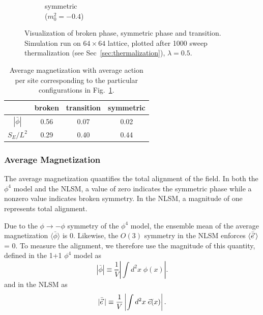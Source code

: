 \begin{figure}[h]
\begin{center}
\begin{subfigure}[b]{0.3\textwidth}
        \caption{symmetric\\($m_0^2=-0.4$)}
      \end{subfigure}
      \hfill
      \caption{\label{fig:primary observables} Visualization of broken phase, symmetric phase and transition. Simulation run on $64\times64$ lattice, plotted after 1000 sweep thermalization (see Sec~\ref{sec:thermalization}), $\lambda=0.5$.}
  \end{center}
\end{figure}

\begin{table}[h]
    \begin{center}
    {\renewcommand{\arraystretch}{1.2} %
    \begin{tabular}{c c c c}
        \hline\hline & broken & transition & symmetric \\ \hline
        $|\bar\phi|$ & 0.56 & 0.07 & 0.02 \\ 
        $S_E/L^2$ & 0.29 & 0.40 & 0.44  \\ \hline\hline
    \end{tabular}}

    \end{center}
    \caption{\label{tab:primary observables} Average magnetization with average action per site corresponding to the particular configurations in Fig.~\ref{fig:primary observables}.}
\end{table}

\subsubsection{Average Magnetization}
\label{sec:avg mag}
The average magnetization quantifies the total alignment of the field. In both the $\phi^4$ model and the NLSM, a value of zero indicates the symmetric phase while a nonzero value indicates broken symmetry. In the NLSM, a magnitude of one represents total alignment.

Due to the $\phi\rightarrow-\phi$ symmetry of the $\phi^4$ model, the ensemble mean of the average magnetization $\langle \bar\phi \rangle$ is $0$. Likewise, the $O(3)$ symmetry in the NLSM enforces $\langle \bar {\vec e}\, \rangle$ = 0. To measure the alignment, we therefore use the magnitude of this quantity, defined in the 1+1 $\phi^4$ model as 
\begin{equation}
|\bar\phi| \equiv \frac{1}{V}\left| \int d^2x \;\phi(x)\right|.
\end{equation}
and in the NLSM as
\begin{equation}
    |\bar{\vec e}\,| \equiv \frac{1}{V}\left|\int d^2x \;\vec e(x)\right|.
\end{equation}

